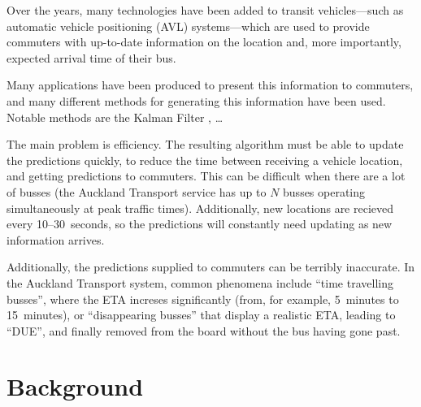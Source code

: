 \documentclass[12pt,a4paper]{article}
\begin{document}
Over the years, many technologies have been added to transit vehicles---such as 
automatic vehicle positioning (AVL) systems---which are used to provide commuters with
up-to-date information on the location and, more importantly, expected arrival time of their bus.


Many applications have been produced to present this information to commuters, and many different methods
for generating this information have been used.
Notable methods are the Kalman Filter \citep{cathey-dailey:2003}, \ldots


The main problem is efficiency.
The resulting algorithm must be able to update the predictions quickly, 
to reduce the time between receiving a vehicle location, and getting predictions to commuters.
This can be difficult when there are a lot of busses (the Auckland Transport service has up to $N$ 
busses operating simultaneously at peak traffic times).
Additionally, new locations are recieved every 10--30~seconds, 
so the predictions will constantly need updating as new information arrives.



Additionally, the predictions supplied to commuters can be terribly inaccurate.
In the Auckland Transport system, common phenomena include ``time travelling busses'', 
where the ETA increses significantly (from, for example, 5~minutes to 15~minutes), 
or ``disappearing busses'' that display a realistic ETA, leading to ``DUE'', 
and finally removed from the board without the bus having gone past.



\section{Background}
\label{sec:background}






\end{document}
